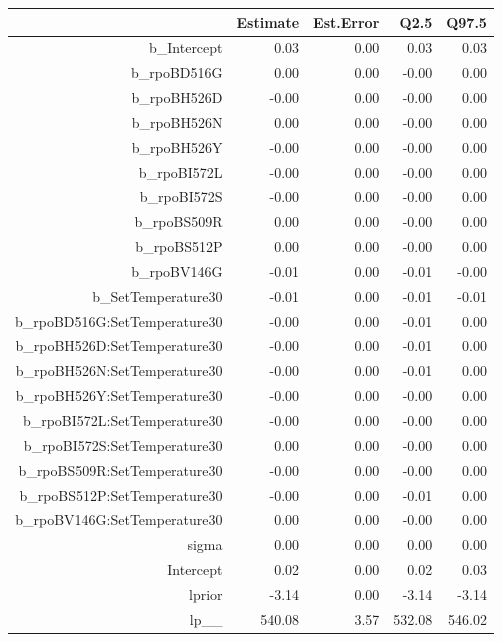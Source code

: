 \begin{table}[ht]
\centering
\begin{tabular}{rrrrr}
  \hline
 & Estimate & Est.Error & Q2.5 & Q97.5 \\ 
  \hline
b\_Intercept & 0.03 & 0.00 & 0.03 & 0.03 \\ 
  b\_rpoBD516G & 0.00 & 0.00 & -0.00 & 0.00 \\ 
  b\_rpoBH526D & -0.00 & 0.00 & -0.00 & 0.00 \\ 
  b\_rpoBH526N & 0.00 & 0.00 & -0.00 & 0.00 \\ 
  b\_rpoBH526Y & -0.00 & 0.00 & -0.00 & 0.00 \\ 
  b\_rpoBI572L & -0.00 & 0.00 & -0.00 & 0.00 \\ 
  b\_rpoBI572S & -0.00 & 0.00 & -0.00 & 0.00 \\ 
  b\_rpoBS509R & 0.00 & 0.00 & -0.00 & 0.00 \\ 
  b\_rpoBS512P & 0.00 & 0.00 & -0.00 & 0.00 \\ 
  b\_rpoBV146G & -0.01 & 0.00 & -0.01 & -0.00 \\ 
  b\_SetTemperature30 & -0.01 & 0.00 & -0.01 & -0.01 \\ 
  b\_rpoBD516G:SetTemperature30 & -0.00 & 0.00 & -0.01 & 0.00 \\ 
  b\_rpoBH526D:SetTemperature30 & -0.00 & 0.00 & -0.01 & 0.00 \\ 
  b\_rpoBH526N:SetTemperature30 & -0.00 & 0.00 & -0.01 & 0.00 \\ 
  b\_rpoBH526Y:SetTemperature30 & -0.00 & 0.00 & -0.00 & 0.00 \\ 
  b\_rpoBI572L:SetTemperature30 & -0.00 & 0.00 & -0.00 & 0.00 \\ 
  b\_rpoBI572S:SetTemperature30 & 0.00 & 0.00 & -0.00 & 0.00 \\ 
  b\_rpoBS509R:SetTemperature30 & -0.00 & 0.00 & -0.00 & 0.00 \\ 
  b\_rpoBS512P:SetTemperature30 & -0.00 & 0.00 & -0.01 & 0.00 \\ 
  b\_rpoBV146G:SetTemperature30 & 0.00 & 0.00 & -0.00 & 0.00 \\ 
  sigma & 0.00 & 0.00 & 0.00 & 0.00 \\ 
  Intercept & 0.02 & 0.00 & 0.02 & 0.03 \\ 
  lprior & -3.14 & 0.00 & -3.14 & -3.14 \\ 
  lp\_\_ & 540.08 & 3.57 & 532.08 & 546.02 \\ 
   \hline
\end{tabular}
\end{table}
